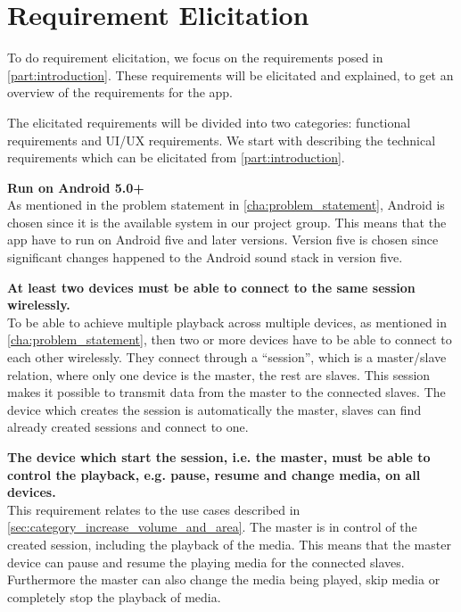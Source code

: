 \section{Requirement Elicitation}
To do requirement elicitation, we focus on the requirements posed in \cref{part:introduction}.
These requirements will be elicitated and explained, to get an overview of the requirements for the app.

The elicitated requirements will be divided into two categories: functional requirements and UI/UX requirements.
We start with describing the technical requirements which can be elicitated from \cref{part:introduction}.

\begin{eletterate}
    \item \textbf{Run on Android 5.0+} \hfill\\
        As mentioned in the problem statement in \cref{cha:problem_statement}, Android is chosen since it is the available system in our project group.
        This means that the app have to run on Android five and later versions.
        Version five is chosen since significant changes happened to the Android sound stack in version five\cite{android_5_sound_stack}.

    \item \textbf{At least two devices must be able to connect to the same session wirelessly.} \hfill\\
        To be able to achieve multiple playback across multiple devices, as mentioned in \cref{cha:problem_statement},
        then two or more devices have to be able to connect to each other wirelessly.
        They connect through a ``session'', which is a master/slave relation, where only one device is the master, the rest are slaves.
        This session makes it possible to transmit data from the master to the connected slaves.
        The device which creates the session is automatically the master, slaves can find already created sessions and connect to one.

    \item \textbf{The device which start the session, i.e. the master, must be able to control the playback, e.g. pause, resume and change media, on all devices.} \hfill\\
        This requirement relates to the use cases described in \cref{sec:category_increase_volume_and_area}.
        The master is in control of the created session, including the playback of the media.
        This means that the master device can pause and resume the playing media for the connected slaves.
        Furthermore the master can also change the media being played, skip media or completely stop the playback of media.


\end{eletterate}
